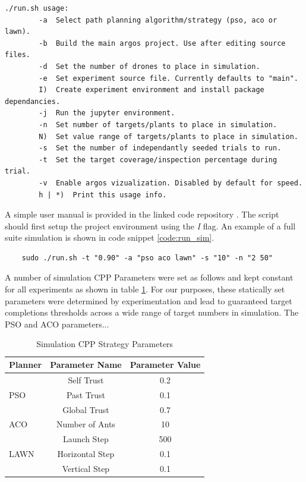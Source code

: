 \documentclass{report}
\newenvironment{code}{\captionsetup{type=listing}}{}
\begin{document}
\begin{code}
\begin{verbatim}
./run.sh usage:
        -a  Select path planning algorithm/strategy (pso, aco or lawn).
        -b  Build the main argos project. Use after editing source files.
        -d  Set the number of drones to place in simulation.
        -e  Set experiment source file. Currently defaults to "main".
        I)  Create experiment environment and install package dependancies.
        -j  Run the jupyter environment.
        -n  Set number of targets/plants to place in simulation.
        N)  Set value range of targets/plants to place in simulation.
        -s  Set the number of independantly seeded trials to run.
        -t  Set the target coverage/inspection percentage during trial.
        -v  Enable argos vizualization. Disabled by default for speed.
        h | *)  Print this usage info.
\end{verbatim}
\label{code:script_help}
\end{code}
\vspace{1cm}

A simple user manual is provided in the linked code repository \cite{SWARMCODE}. The script should first setup the project environment using the \textit{I} flag. An example of a full suite simulation is shown in code snippet \ref{code:run_sim}.

\begin{code}
\begin{verbatim}
	sudo ./run.sh -t "0.90" -a "pso aco lawn" -s "10" -n "2 50"
\end{verbatim}
\label{code:run_sim}
\end{code}
\vspace{1cm}

A number of simulation CPP Parameters were set as follows and kept constant for all experiments as shown in table \ref{tab:sim_cpp_params}. For our purposes, these statically set parameters were determined by experimentation and lead to guaranteed target completions thresholds across a wide range of target numbers in simulation. The PSO and ACO parameters...

\bgroup
\def\arraystretch{1.5}%
\begin{table}[h]
  \centering
  \begin{tabular}{|l|c|c|}
  \hline
  \textbf{Planner} & \textbf{Parameter Name} & \textbf{Parameter Value} \\
  \hline
  \multirow{3}{*}{PSO} & Self Trust & 0.2 \\
	& Past Trust & 0.1 \\
	& Global Trust & 0.7 \\
  \hline
  ACO & Number of Ants & 10 \\
  \hline
  \multirow{3}{*}{LAWN} & Launch Step & 500 \\
	& Horizontal Step & 0.1 \\
	& Vertical Step & 0.1 \\
  \hline
  \end{tabular}
  \caption{Simulation CPP Strategy Parameters}
  \label{tab:sim_cpp_params}
\end{table}
\egroup
\end{document}
